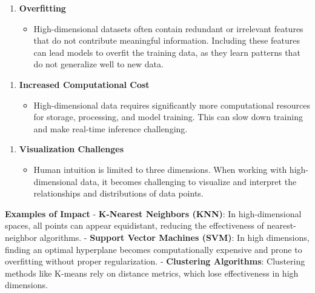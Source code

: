 \documentclass{article}
\providecommand{\tightlist}{%
      \setlength{\itemsep}{0pt}\setlength{\parskip}{0pt}}
\begin{document}
\begin{enumerate}
\def\labelenumi{\arabic{enumi}.}
\setcounter{enumi}{2}
\tightlist
\item
  \textbf{Overfitting}

  \begin{itemize}
  \tightlist
  \item
    High-dimensional datasets often contain redundant or irrelevant
    features that do not contribute meaningful information. Including
    these features can lead models to overfit the training data, as they
    learn patterns that do not generalize well to new data.
  \end{itemize}
\end{enumerate}

\begin{enumerate}
\def\labelenumi{\arabic{enumi}.}
\setcounter{enumi}{3}
\tightlist
\item
  \textbf{Increased Computational Cost}

  \begin{itemize}
  \tightlist
  \item
    High-dimensional data requires significantly more computational
    resources for storage, processing, and model training. This can slow
    down training and make real-time inference challenging.
  \end{itemize}
\end{enumerate}

\begin{enumerate}
\def\labelenumi{\arabic{enumi}.}
\setcounter{enumi}{4}
\tightlist
\item
  \textbf{Visualization Challenges}

  \begin{itemize}
  \tightlist
  \item
    Human intuition is limited to three dimensions. When working with
    high-dimensional data, it becomes challenging to visualize and
    interpret the relationships and distributions of data points.
  \end{itemize}
\end{enumerate}

\textbf{Examples of Impact} - \textbf{K-Nearest Neighbors (KNN)}: In
high-dimensional spaces, all points can appear equidistant, reducing the
effectiveness of nearest-neighbor algorithms. - \textbf{Support Vector
Machines (SVM)}: In high dimensions, finding an optimal hyperplane
becomes computationally expensive and prone to overfitting without
proper regularization. - \textbf{Clustering Algorithms}: Clustering
methods like K-means rely on distance metrics, which lose effectiveness
in high dimensions.
\end{document}
